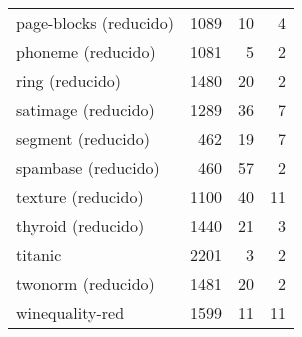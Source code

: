 \begin{tabular}{lrrr}
page-blocks (reducido)    &    1089      &    10       &  4     \\  
phoneme  (reducido)       &    1081      &     5      &   2    \\
ring   (reducido)         &    1480      &    20       &  2     \\
satimage (reducido)       &    1289      &    36       &  7     \\
segment  (reducido)       &     462     &     19      &   7    \\
spambase  (reducido)      &     460     &     57      &   2    \\
texture  (reducido)       &    1100      &    40       &  11     \\
thyroid  (reducido)       &    1440      &    21       &   3    \\
titanic                   &    2201      &     3      &    2   \\
twonorm  (reducido)       &    1481      &    20       &   2    \\
winequality-red           &    1599      &    11       &  11     \\
\bottomrule
\end{tabular}